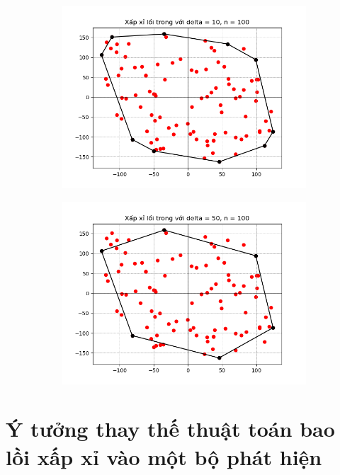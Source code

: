 \documentclass[11pt]{beamer}
\theoremstyle{definition}
\theoremstyle{plain}
\theoremstyle{plain}
\theoremstyle{remark}
\begin{document}
\begin{frame}
\begin{figure}[htbp]
		\begin{subfigure}[b]{0.4\textwidth}
			\includegraphics[width=\textwidth]{inner_delta10}
			\label{fig:inner_delta10}
		\end{subfigure}
		\hfill
		\begin{subfigure}[b]{0.4\textwidth}
			\includegraphics[width=\textwidth]{inner_delta50}
			\label{fig:inner_delta50}
		\end{subfigure}
	\end{figure}
\end{frame}

	\section{Ý tưởng thay thế thuật toán bao lồi xấp xỉ vào một bộ phát hiện}
\end{document}
